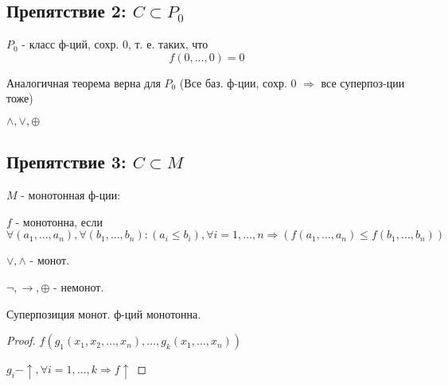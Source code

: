 \subsection{Препятствие 2: $C \subset P_0$}
\begin{definition}
$P_0$ - класс ф-ций, сохр. 0, т. е. таких, что
\[
  f(0, \ldots, 0) = 0
\]

Аналогичная теорема верна для $P_0$ (Все баз. ф-ции, сохр. 0 $\Rightarrow$ все суперпоз-ции тоже)
\end{definition}
\begin{example}
 $\land, \lor, \oplus $
\end{example}

\subsection{Препятствие 3: $C \subset M$}
\begin{definition}
$M$ - монотонная ф-ции:

$f$ - монотонна, если $\forall (a_1, \ldots, a_n), \forall (b_1, \ldots, b_n) \colon (a_i \leq b_i), \forall i=1,\ldots,n \Rightarrow (f(a_1, \ldots, a_n) \leq f(b_1, \ldots, b_n))$
\end{definition}

\begin{example}
$\lor, \land$ - монот.

$\neg, \rightarrow, \oplus$ - немонот.
\end{example}
\begin{statement}
Суперпозиция монот. ф-ций монотонна.
\end{statement}
\begin{proof}
$f(g_1(x_1, x_2, \ldots, x_n), \ldots, g_k(x_1, \ldots, x_n))$

$g_i - \uparrow, \forall i = 1, \ldots , k \Rightarrow f \uparrow$
\end{proof}
